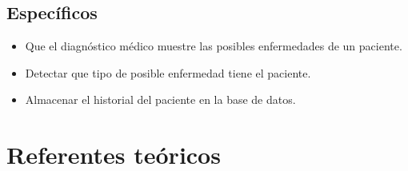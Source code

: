 \documentclass[preprint,12pt]{elsarticle}
\begin{document}
		\subsection{\textbf{Específicos }}
\begin{itemize}
	\item Que el diagnóstico médico muestre las posibles enfermedades de un paciente.
	\item Detectar que tipo de posible enfermedad tiene el paciente. 
	\item Almacenar el historial del paciente en la base de datos. 
	\end{itemize}

	\section{Referentes teóricos}
\end{document}
